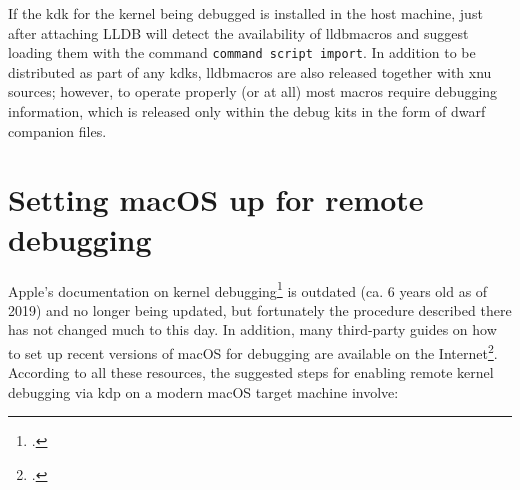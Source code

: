 If the \gls{kdk} for the kernel being debugged is installed in the host machine, just after attaching LLDB will detect the availability of lldbmacros and suggest loading them with the command \lstinline{command script import}. In addition to be distributed as part of any \glspl{kdk}, lldbmacros are also released together with \gls{xnu} sources; however, to operate properly (or at all) most macros require debugging information, which is released only within the debug kits in the form of \gls{dwarf} companion files.


\section{Setting macOS up for remote debugging}\label{sec:setup}
Apple's documentation on kernel debugging\footcite{DarwinDoc1} is outdated (ca. 6 years old as of 2019) and no longer being updated, but fortunately the procedure described there has not changed much to this day. In addition, many third-party guides on how to set up recent versions of macOS for debugging are available on the Internet\footcites{MacOSDebug2,MacOSDebug3,MacOSDebug4,MacOSDebug5}. According to all these resources, the suggested steps for enabling remote kernel debugging via \gls{kdp} on a modern macOS target machine involve:
